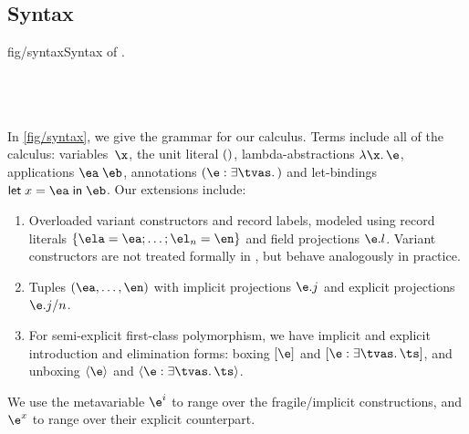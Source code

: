 \documentclass[acmsmall,screen,nonacm,review]{acmart}
\begin{document}
\subsection{Syntax}

\begin{bnffig}[t]{fig/syntax}{Syntax of \OML.}
\\[1ex]
\entry[Types]{\t}{
   \tv \and
   1 \and
   \tya \to \tyb \and
   \T \tys \and
   \Pi \iton \ti \and
   \tpoly \ts
}\\
\\
\\
\end{bnffig}

In \cref {fig/syntax}, we give the grammar for our calculus. Terms include
all of the \ML calculus: variables~$\x$, the unit literal $()$,
lambda-abstractions $\efun \x \e$, applications $\eapp \ea \eb$,
annotations $\eannot \e \tvs \t$ and let-bindings $\elet x \ea \eb$.
Our extensions include:
\begin{enumerate}
\item
  Overloaded variant constructors and record labels, modeled using record
  literals $\erecord { \ela = \ea; \ldots; \el_n = \en }$ and field
  projections $\efield \e l$. Variant constructors are not treated formally in \OML, but
    behave analogously in practice.
\item
  Tuples $(\ea, \ldots, \en)$ with implicit projections
  $\efield \e j$ and explicit projections $\exproj \e j n$.

\item
  For semi-explicit first-class polymorphism, we have implicit and explicit
    introduction and elimination forms: boxing $\epoly \e$ and $\expoly
    \e \tvs \ts$, and unboxing $\einst \e$ and $\exinst \e \tvs \ts$.

\end{enumerate}
We use the metavariable $\e^i$ to range over the
fragile/implicit constructions, and $\e^x$ to range over their
explicit counterpart.
\end{document}
